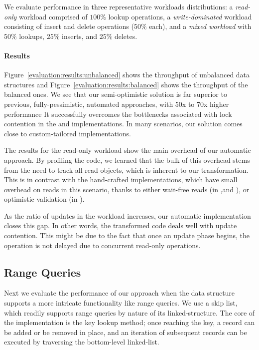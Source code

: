 We evaluate performance in three representative workloads distributions: a
\emph{read-only} workload comprised of $100\%$ lookup operations, a \emph{write-dominated}
workload consisting of insert and delete operations ($50\%$ each), and a
\emph{mixed workload} with $50\%$ lookups, $25\%$ inserts, and $25\%$
deletes.

\paragraph{Results}
Figure~\ref{evaluation:results:unbalanced}
shows the throughput of unbalanced data structures and Figure~\ref{evaluation:results:balanced} shows
the throughput of the balanced ones. We see that our semi-optimistic
solution is far superior to previous, fully-pessimistic,
automated approaches, with 50x to 70x
higher performance
It successfully overcomes the bottlenecks associated with lock contention
in the \domTree and \domTreap implementations. In
many scenarios, our solution comes close to custom-tailored implementations.


The results for the read-only workload show the main overhead
of our automatic approach. By profiling the code, we learned
that the bulk of this overhead stems from the need to track all read objects,
which is inherent to our transformation.
This is in contrast with the hand-crafted implementations,
which have small overhead on reads in this scenario, thanks to either
wait-free reads (in \danaAVL,\friendly and \lockfreeTree ), or optimistic validation (in \bronson).

As the ratio of updates in the workload increases, our automatic implementation
closes this gap.
In other words, the transformed code deals well with update contention.
This might be due to the fact that once
an update phase begins, the operation is not delayed due to concurrent
read-only operations.


\subsection{Range Queries}
\label{sec:range}

Next we evaluate the performance of our approach when the data
structure supports a more intricate functionality like range queries.
We use a skip list, which readily supports range queries by
nature of its linked-structure. The core of the implementation is the key lookup
method; once reaching the key, a record can be added or be removed in place, and
an iteration of subsequent records can be executed by traversing
the bottom-level linked-list.


